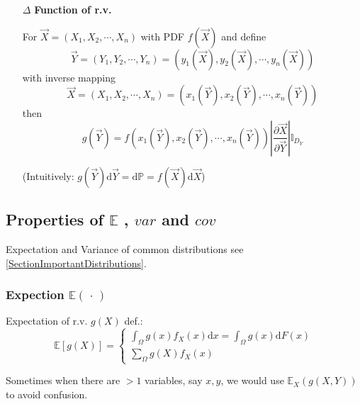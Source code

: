     \begin{itemize}
        \item[$\Delta$] \textbf{Function of r.v.}
        
        For $\vec{X}=(X_1,X_2,\cdots,X_n)$ with PDF $f(\vec{X})$ and define 
        \begin{equation}    
            \vec{Y}=(Y_1,Y_2,\cdots,Y_n)=\left(y_1(\vec{X}),y_2(\vec{X}),\cdots,y_n(\vec{X})\right)
        \end{equation}
        with inverse mapping
        \begin{equation}    
            \vec{X}=(X_1,X_2,\cdots,X_n)=\left(x_1(\vec{Y}),x_2(\vec{Y}),\cdots,x_n(\vec{Y})\right)
        \end{equation}
        then
        \begin{equation}    
            g(\vec{Y})= f\left(x_1(\vec{Y}),x_2(\vec{Y}),\cdots,x_n(\vec{Y})\right)\left|\frac{\partial \vec{X}}{\partial\vec{Y}}\right|\mathbb{I}_{D_Y}
        \end{equation}

        (Intuitively: $g\left(\vec{Y} \right)\mathrm{d}\vec{Y}=\mathrm{d}\mathbb{P}=f(\vec{X})\mathrm{d}\vec{X}$)
    \end{itemize}




\subsection{Properties of $\mathbb{E}$ , $var$ and $cov$}

    Expectation and Variance of common distributions see \autoref{SectionImportantDistributions}.

\subsubsection{Expection $ \mathbb{E}(\,\cdot\,) $}
    Expectation of r.v. $g(X)$ def.:
    \begin{equation}
    \mathbb{E} [g(X)]=\begin{cases}
        {\displaystyle\int_\Omega g(x) f_X(x)\mathrm{d}x=\int_\Omega g(x)\mathrm{d}F(x)}\\
        {\displaystyle\sum_{\Omega}g(X)f_X(x)}
    \end{cases}
\end{equation}

    Sometimes when there are $ >1 $ variables, say $ x,y $, we would use $ \mathbb{E}_X\left( g(X,Y) \right)  $ to avoid confusion.
 
